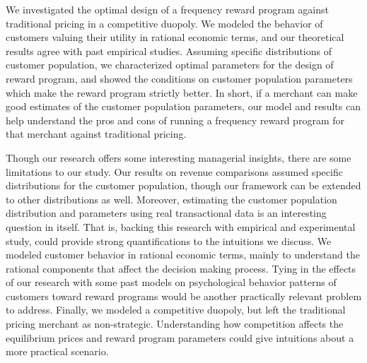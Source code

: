 We investigated the optimal design of a frequency reward program against traditional pricing in a competitive duopoly.
We modeled the behavior of customers valuing their utility in rational economic terms, and our theoretical results agree with past empirical studies.
Assuming specific distributions of customer population, we characterized optimal parameters for the design of reward program, and showed the conditions on customer population parameters which make the reward program strictly better.
In short, if a merchant can make good estimates of the customer population parameters, our model and results can help understand the pros and cons of running a frequency reward program for that merchant against traditional pricing.

Though our research offers some interesting managerial insights, there are some limitations to our study. 
Our results on revenue comparisons assumed specific distributions for the customer population, though our framework can be extended to other distributions as well. Moreover, estimating the customer population distribution and parameters using real transactional data is an interesting question in itself.
That is, backing this research with empirical and experimental study, could provide strong quantifications to the intuitions we discuss.
We modeled customer behavior in rational economic terms, mainly to understand the rational components that affect the decision making process.
Tying in the effects of our research with some past models on psychological behavior patterns of customers toward reward programs would be another practically relevant problem to address.
Finally, we modeled a competitive duopoly, but left the traditional pricing merchant as non-strategic.
Understanding how competition affects the equilibrium prices and reward program parameters could give intuitions about a more practical scenario. 
